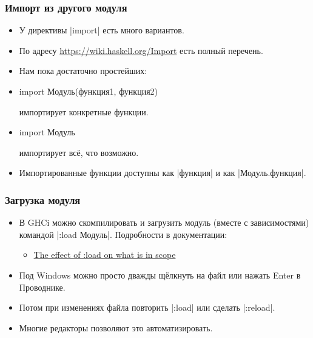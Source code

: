 \documentclass[10pt]{beamer}
\begin{document}
\begin{frame}[fragile]
  \frametitle{Импорт из другого модуля}
  \begin{itemize}
    \item У директивы \haskinline|import| есть много вариантов.
    \item По адресу \url{https://wiki.haskell.org/Import} есть полный перечень.
    \item Нам пока достаточно простейших:
    \item \begin{haskell}
            import Модуль(функция1, функция2)
          \end{haskell}
          импортирует конкретные функции.
    \item \begin{haskell}
            import Модуль
          \end{haskell}
          импортирует всё, что возможно.
    \item Импортированные функции доступны как \haskinline|функция| и как \haskinline|Модуль.функция|.
  \end{itemize}
\end{frame}

\begin{frame}[fragile]
  \frametitle{Загрузка модуля}
  \begin{itemize}
    \item В GHCi можно скомпилировать и загрузить модуль (вместе с зависимостями) командой \haskinline|:load Модуль|. Подробности в документации:
          \begin{itemize}
            \item \href{http://downloads.haskell.org/~ghc/latest/docs/html/users_guide/ghci.html#ghci-load-scope}{The effect of :load on what is in scope}
          \end{itemize}
    \item Под Windows можно просто дважды щёлкнуть на файл или нажать Enter в Проводнике.
    \item Потом при изменениях файла повторить \haskinline|:load| или сделать \haskinline|:reload|.
    \item Многие редакторы позволяют это автоматизировать.
  \end{itemize}
\end{frame}
\end{document}
